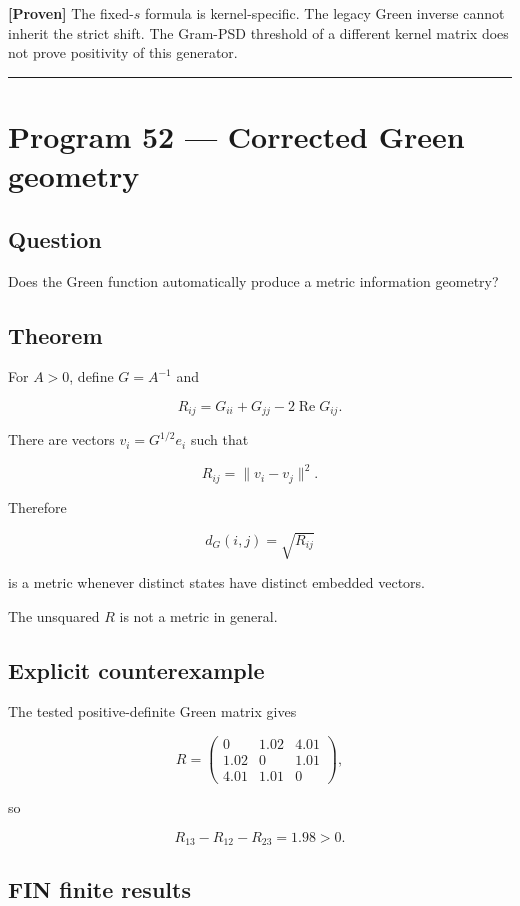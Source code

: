 \documentclass[11pt,a4paper,openany]{report}
\newcommand{\statusProven}{\textcolor{fingreen}{[Proven]}}
\begin{document}
\textbf{\statusProven{}} The fixed-\(s\) formula is kernel-specific. The legacy Green inverse cannot inherit the strict shift. The Gram-PSD threshold of a different kernel matrix does not prove positivity of this generator.

\par\medskip\hrule\medskip

\chapter{Program 52 — Corrected Green geometry}

\section{Question}

Does the Green function automatically produce a metric information geometry?

\section{Theorem}

For \(A>0\), define \(G=A^{-1}\) and

\[
R_{ij}
=
G_{ii}+G_{jj}-2\operatorname{Re}G_{ij}.
\]

There are vectors \(v_i=G^{1/2}e_i\) such that

\[
R_{ij}=\|v_i-v_j\|^2.
\]

Therefore

\[
d_G(i,j)=\sqrt{R_{ij}}
\]

is a metric whenever distinct states have distinct embedded vectors.

The unsquared \(R\) is not a metric in general.

\section{Explicit counterexample}

The tested positive-definite Green matrix gives

\[
R=
\begin{pmatrix}
0&1.02&4.01\\
1.02&0&1.01\\
4.01&1.01&0
\end{pmatrix},
\]

so

\[
R_{13}-R_{12}-R_{23}=1.98>0.
\]

\section{FIN finite results}
\end{document}
